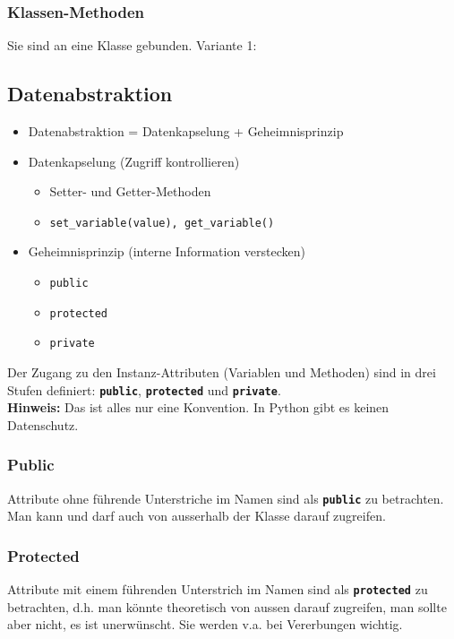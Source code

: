 \subsubsection{Klassen-Methoden}
Sie sind an eine Klasse gebunden.
Variante 1:


\subsection{Datenabstraktion}
\begin{itemize}
	\item Datenabstraktion = Datenkapselung + Geheimnisprinzip
	\item Datenkapselung (Zugriff kontrollieren)
	\begin{itemize}
		\item Setter- und Getter-Methoden
		\item[\-] \texttt{set\_variable(value), get\_variable()}
	\end{itemize}
	\item Geheimnisprinzip (interne Information verstecken)
	\begin{itemize}
		\item \texttt{public}
		\item \texttt{protected}
		\item \texttt{private}
	\end{itemize}
\end{itemize}
Der Zugang zu den Instanz-Attributen (Variablen und Methoden) sind in drei Stufen definiert: \textbf{\texttt{public}}, \textbf{\texttt{protected}} und \textbf{\texttt{private}}.\\
\textbf{Hinweis:} Das ist alles nur eine Konvention. In Python gibt es keinen Datenschutz.


\subsubsection{Public}
Attribute ohne führende Unterstriche im Namen sind als \textbf{\texttt{public}} zu betrachten. Man kann und darf auch von ausserhalb der Klasse darauf zugreifen.


\subsubsection{Protected}
Attribute mit einem führenden Unterstrich im Namen sind als \textbf{\texttt{protected}} zu betrachten, d.h. man könnte theoretisch von aussen darauf zugreifen, man sollte aber nicht, es ist unerwünscht. Sie werden v.a. bei Vererbungen wichtig.


